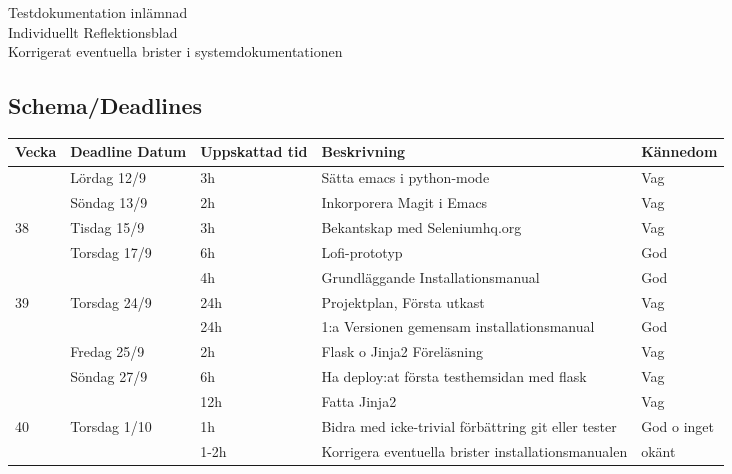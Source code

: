 \documentclass{TDP003mall}
\begin{document}
\begin{itemize}
Testdokumentation inlämnad\\
Individuellt Reflektionsblad\\
Korrigerat eventuella brister i systemdokumentationen\\


\subsection{Schema/Deadlines}

\begin{tabularx}{\linewidth}{|l|l|l|X|l|}
	\hline
	Vecka & Deadline Datum & Uppskattad tid & Beskrivning                                         & Kännedom    \\ [0.5ex]
	\hline
          & Lördag 12/9    & 3h             & Sätta emacs i python-mode                           & Vag         \\
	\hline
          & Söndag 13/9    & 2h             & Inkorporera Magit i Emacs                           & Vag         \\
	\hline
	38    & Tisdag 15/9    & 3h             & Bekantskap med Seleniumhq.org                       & Vag         \\
	\hline
          & Torsdag 17/9   & 6h             & Lofi-prototyp                                       & God         \\
	\hline
          &                & 4h             & Grundläggande Installationsmanual                   & God         \\
	\hline
	39    & Torsdag 24/9   & 24h            & Projektplan, Första utkast                          & Vag         \\
	\hline
          &                & 24h            & 1:a Versionen gemensam installationsmanual          & God         \\
	\hline
          & Fredag 25/9    & 2h             & Flask o Jinja2 Föreläsning                          & Vag         \\
	\hline
          & Söndag 27/9    & 6h             & Ha deploy:at första testhemsidan med flask          & Vag         \\
	\hline
          &                & 12h            & Fatta Jinja2                                        & Vag         \\
	\hline
	40    & Torsdag 1/10   & 1h             & Bidra med icke-trivial förbättring git eller tester & God o inget \\
	\hline
          &                & 1-2h           & Korrigera eventuella brister installationsmanualen  & okänt       \\

\end{tabularx}
\end{itemize}
\end{document}

